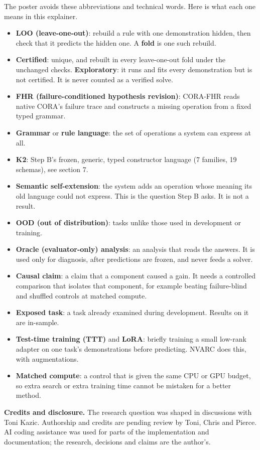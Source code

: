 \documentclass[11pt]{article}
\newcommand{\page}[1]{\clearpage{\Large\bfseries #1}\par\vspace{0.2em}}
\newcommand{\term}[1]{\textbf{#1}}
\begin{document}
\page{12. Terms kept off the poster}
The poster avoids these abbreviations and technical words. Here is what each one means in this explainer.
\begin{itemize}
  \item \term{LOO (leave-one-out)}: rebuild a rule with one demonstration hidden, then check that it predicts the hidden
        one. A \term{fold} is one such rebuild.
  \item \term{Certified}: unique, and rebuilt in every leave-one-out fold under the unchanged checks.
        \term{Exploratory}: it runs and fits every demonstration but is not certified. It is never counted as a
        verified solve.
  \item \term{FHR (failure-conditioned hypothesis revision)}: CORA-FHR reads native CORA's failure trace and constructs
        a missing operation from a fixed typed grammar.
  \item \term{Grammar} or \term{rule language}: the set of operations a system can express at all.
  \item \term{K2}: Step B's frozen, generic, typed constructor language (7 families, 19 schemas), see section 7.
  \item \term{Semantic self-extension}: the system adds an operation whose meaning its old language could not express.
        This is the question Step B asks. It is not a result.
  \item \term{OOD (out of distribution)}: tasks unlike those used in development or training.
  \item \term{Oracle (evaluator-only) analysis}: an analysis that reads the answers. It is used only for diagnosis, after
        predictions are frozen, and never feeds a solver.
  \item \term{Causal claim}: a claim that a component caused a gain. It needs a controlled comparison that isolates
        that component, for example beating failure-blind and shuffled controls at matched compute.
  \item \term{Exposed task}: a task already examined during development. Results on it are in-sample.
  \item \term{Test-time training (TTT)} and \term{LoRA}: briefly training a small low-rank adapter on one task's
        demonstrations before predicting. NVARC does this, with augmentations.
  \item \term{Matched compute}: a control that is given the same CPU or GPU budget, so extra search or extra training
        time cannot be mistaken for a better method.
\end{itemize}


\textbf{Credits and disclosure.} The research question was shaped in discussions with Toni Kazic. Authorship and
credits are pending review by Toni, Chris and Pierce. AI coding assistance was used for parts of the implementation
and documentation; the research, decisions and claims are the author's.
\end{document}
